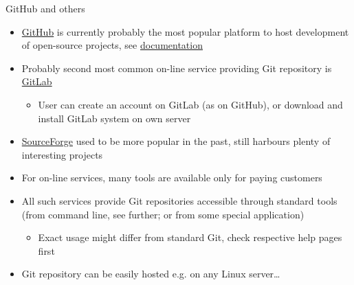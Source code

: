 \documentclass[compress, ucs, xelatex, 11pt, xcolor=svgnames, aspectratio=169,
	hyperref={
		bookmarks=true,
		unicode=true,
		colorlinks=true,
		pdftitle={Linux, command line and MetaCentrum},
		plainpages=false,
		pdfauthor={Vojtech Zeisek},
		pdfsubject={Course about use of Linux command line, writing shell scripts and using MetaCentrum of CESNET},
		pdfcreator={XeLaTeX},
		pdfkeywords={Linux, GNU, BASH, shell, command line, MetaCentrum},
		linkcolor=DarkRed, %
		anchorcolor=DarkBlue, %
		citecolor=Indigo, %
		filecolor=NavyBlue, %
		menucolor=DarkMagenta, %
		urlcolor=DarkBlue, %
		pdftex},
	url={hyphens, lowtilde} %
	]{beamer}
\begin{document}
\begin{frame}{GitHub and others}
	\begin{itemize}
		\item \href{https://github.com/}{GitHub} is currently probably the most popular platform to host development of open-source projects, see \href{https://help.github.com/}{documentation}
		\item Probably second most common on-line service providing Git repository is \href{https://about.gitlab.com/}{GitLab}
		\begin{itemize}
			\item User can create an account on GitLab (as on GitHub), or download and install GitLab system on own server
		\end{itemize}
		\item \href{https://sourceforge.net/}{SourceForge} used to be more popular in the past, still harbours plenty of interesting projects
		\item For on-line services, many tools are available only for paying customers
		\item All such services provide Git repositories accessible through standard tools (from command line, see further; or from some special application)
		\begin{itemize}
			\item Exact usage might differ from standard Git, check respective help pages first
		\end{itemize}
		\item Git repository can be easily hosted e.g. on any Linux server\ldots
	\end{itemize}
\end{frame}
\end{document}
